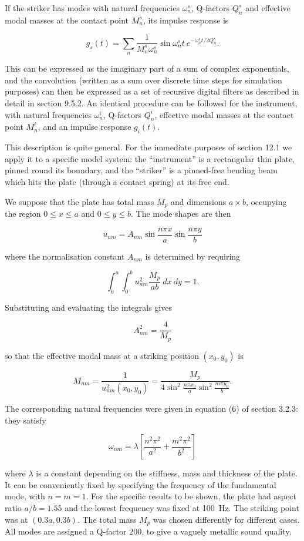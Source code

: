   If the striker has modes with natural frequencies $\omega_n^s$, Q-factors 
  $Q_n^s$ and effective modal masses at the contact point $M_n^s$, its impulse 
  response is 

  $$g_s(t)=\sum_n{\dfrac{1}{M_n^s \omega_n^s} \sin \omega_n^s t~e^{-\omega_n^s 
  t/2 Q_n^s}}. \tag{5}$$ 

  This can be expressed as the imaginary part of a sum of complex exponentials, 
  and the convolution (written as a sum over discrete time steps for simulation 
  purposes) can then be expressed as a set of recursive digital filters as 
  described in detail in section 9.5.2. An identical procedure can be followed 
  for the instrument, with natural frequencies $\omega_n^i$, Q-factors $Q_n^i$, 
  effective modal masses at the contact point $M_n^i$, and an impulse response 
  $g_i(t)$. 

  This description is quite general. For the immediate purposes of section 12.1 
  we apply it to a specific model system: the ``instrument'' is a rectangular 
  thin plate, pinned round its boundary, and the ``striker'' is a pinned-free 
  bending beam which hits the plate (through a contact spring) at its free end. 

  We suppose that the plate has total mass $M_p$ and dimensions $a \times b$, 
  occupying the region $0 \le x \le a$ and $0 \le y \le b$. The mode shapes are 
  then 

  $$u_{nm}=A_{nm} \sin \dfrac{n \pi x}{a} \sin \dfrac{n \pi y}{b} \tag{6}$$ 

  where the normalisation constant $A_{nm}$ is determined by requiring 

  $$\int_0^a{\int_0^b{ u^2_{nm} \dfrac{M_p}{ab}~dx~dy}}=1 . \tag{7}$$ 

  Substituting and evaluating the integrals gives 

  $$A^2_{nm}=\dfrac{4}{M_p} \tag{8}$$ 

  so that the effective modal mass at a striking position $(x_0,y_0)$ is 

  $$M_{nm}=\dfrac{1}{u^2_{nm}(x_0,y_0)}=\dfrac{M_p}{4 \sin^2 \frac{n \pi 
  x_0}{a} \sin^2 \frac{m \pi y_0}{b}} . \tag{9}$$ 

  The corresponding natural frequencies were given in equation (6) of section 
  3.2.3: they satisfy 

  $$\omega_{nm} = \lambda \left[\frac{n^2 \pi^2}{a^2}+\frac{m^2 \pi^2}{b^2} 
  \right] \tag{10}$$ 

  where $\lambda$ is a constant depending on the stiffness, mass and thickness 
  of the plate. It can be conveniently fixed by specifying the frequency of the 
  fundamental mode, with $n=m=1$. For the specific results to be shown, the 
  plate had aspect ratio $a/b = 1.55$ and the lowest frequency was fixed at 
  100~Hz. The striking point was at $(0.3a,0.3b)$. The total mass $M_p$ was 
  chosen differently for different cases. All modes are assigned a Q-factor 
  200, to give a vaguely metallic sound quality. 

